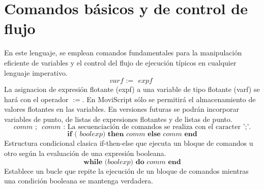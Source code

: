\documentclass[11pt]{scrartcl}
\begin{document}
\section{Comandos b\'asicos y de control de flujo}
En este lenguaje, se emplean comandos fundamentales para la 
manipulación eficiente de variables y el control del flujo de ejecución t\'ipicos
en cualquier lenguaje imperativo.\newline
\begin{equation*}
    \textit{varf} \textbf{ := } \textit{ expf }
\end{equation*}
La asignacion de expresi\'on flotante (expf) a una variable de tipo flotante (varf) se har\'a con el 
operador $:=$. En MoviScript s\'olo se permitir\'a el almacenamiento de valores flotantes 
en las variables. En versiones futuras se podr\'an incorporar variables de punto, de listas de 
expresiones flotantes y de listas de punto.
\begin{equation*}
    \textit{comm} \textbf{ ; } \textit{ comm }
    \text {: La secuenciaci\'on de comandos se realiza con el caracter ';'.}
\end{equation*}
\begin{equation*}
\textbf{ if ( } \textit{boolexp} \textbf{) then } \textit{comm} \textbf{ else } \textit{comm} \textbf{ end }
\end{equation*}
Estructura condicional clasica if-then-else que ejecuta un bloque de comandos u otro seg\'un la evaluación de una expresión booleana.
\newline
\begin{equation*}
\textbf{ while (} \textit{boolexp} \textbf{) do } \textit{comm} \textbf{ end }
\end{equation*}
Establece un bucle que repite la ejecuci\'on de un bloque de
comandos mientras una condici\'on booleana se mantenga verdadera.
\end{document}
